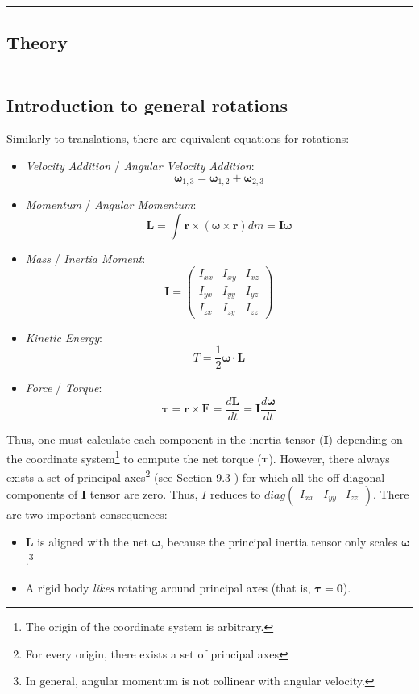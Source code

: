 {\color{gray}\hrule}
\begin{center}
\section{Theory}
\bigskip
\end{center}
{\color{gray}\hrule}

\begin{multicols}{2}
\subsection{Introduction to general rotations}
\label{sec:theory:introduction}

Similarly to translations, there are equivalent equations for rotations:
\begin{itemize}
\item \emph{Velocity Addition} / \emph{Angular Velocity Addition}: $$\boldsymbol\omega_{1,3} = \boldsymbol\omega_{1,2} + \boldsymbol\omega_{2,3}$$
\item \emph{Momentum} / \emph{Angular Momentum}: $$\mathbf{L} = \int \mathbf{r} \times (\boldsymbol\omega \times \mathbf{r}) dm = \mathbf{I} \boldsymbol\omega$$
\item \emph{Mass} / \emph{Inertia Moment}: $$\mathbf{I} = \begin{pmatrix} I_{xx} & I_{xy} & I_{xz} \\ I_{yx} & I_{yy} & I_{yz} \\ I_{zx} & I_{zy} & I_{zz} \end{pmatrix}$$
\item \emph{Kinetic Energy}: $$T = \frac{1}{2} \boldsymbol\omega \cdot \mathbf{L} $$
\item \emph{Force} / \emph{Torque}: $$\boldsymbol\tau = \mathbf{r} \times \mathbf{F} = \frac{d\mathbf{L}}{dt} = \mathbf{I}\frac{d\boldsymbol\omega}{dt}$$
\end{itemize}

Thus, one must calculate each component in the inertia tensor ($\mathbf{I}$) depending on the coordinate system\footnote{The origin of the coordinate system is arbitrary.} to compute the net torque ($\boldsymbol{\tau}$). However, there always exists a set of principal axes\footnote{For every origin, there exists a set of principal axes} (see Section 9.3 \cite{morin}) for which all the off-diagonal components of $\mathbf{I}$ tensor are zero. Thus, $I$ reduces to $diag \begin{pmatrix} I_{xx} & I_{yy} & I_{zz} \end{pmatrix}$. There are two important consequences:
\begin{itemize}
\item $\mathbf{L}$ is aligned with the net $\boldsymbol\omega$, because the principal inertia tensor only scales $\boldsymbol\omega$.\footnote{In general, angular momentum is not collinear with angular velocity.}
\item A rigid body \emph{likes} rotating around principal axes (that is, $\boldsymbol\tau = \mathbf{0}$).
\end{itemize}


\end{multicols}
